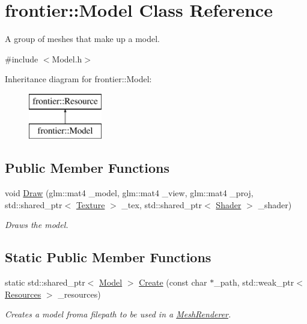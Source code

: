 \hypertarget{classfrontier_1_1_model}{}\section{frontier\+:\+:Model Class Reference}
\label{classfrontier_1_1_model}


A group of meshes that make up a model.  




{\ttfamily \#include $<$Model.\+h$>$}

Inheritance diagram for frontier\+:\+:Model\+:\begin{figure}[H]
\begin{center}
\leavevmode
\includegraphics[height=2.000000cm]{classfrontier_1_1_model}
\end{center}
\end{figure}
\subsection*{Public Member Functions}
\begin{DoxyCompactItemize}
\item 
void \hyperlink{classfrontier_1_1_model_ab969b8ae4c222ac60f347a5008b19bad}{Draw} (glm\+::mat4 \+\_\+model, glm\+::mat4 \+\_\+view, glm\+::mat4 \+\_\+proj, std\+::shared\+\_\+ptr$<$ \hyperlink{classfrontier_1_1_texture}{Texture} $>$ \+\_\+tex, std\+::shared\+\_\+ptr$<$ \hyperlink{classfrontier_1_1_shader}{Shader} $>$ \+\_\+shader)
\begin{DoxyCompactList}\small\item\em Draws the model. \end{DoxyCompactList}\end{DoxyCompactItemize}
\subsection*{Static Public Member Functions}
\begin{DoxyCompactItemize}
\item 
static std\+::shared\+\_\+ptr$<$ \hyperlink{classfrontier_1_1_model}{Model} $>$ \hyperlink{classfrontier_1_1_model_a78f05cbc47e201551ccf3bbbd1d0fcbd}{Create} (const char $\ast$\+\_\+path, std\+::weak\+\_\+ptr$<$ \hyperlink{classfrontier_1_1_resources}{Resources} $>$ \+\_\+resources)
\begin{DoxyCompactList}\small\item\em Creates a model froma filepath to be used in a \hyperlink{classfrontier_1_1_mesh_renderer}{Mesh\+Renderer}. \end{DoxyCompactList}\end{DoxyCompactItemize}
